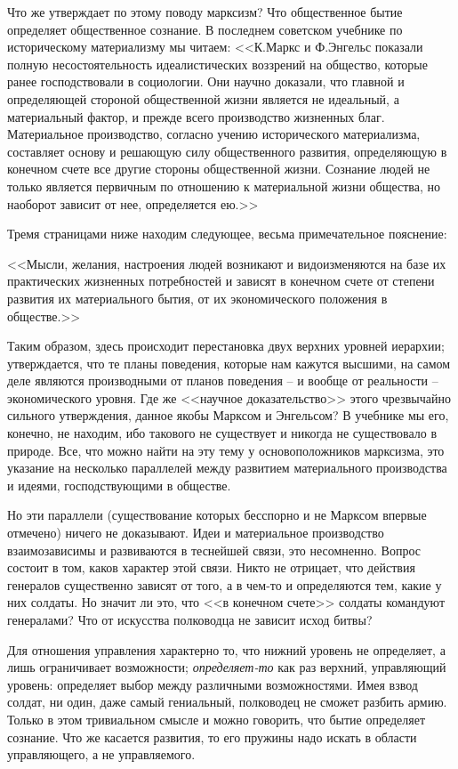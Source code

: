 \documentclass{book}
\begin{document}
Что же утверждает по этому поводу марксизм? Что обще­ственное бытие определяет общественное сознание. В послед­нем советском 
учебнике по историческому материализму мы читаем: <<К.Маркс и Ф.Энгельс показали полную несостоятельность идеалистических 
воззрений на общество, которые ранее господ­ствовали в социологии. Они научно доказали, что главной и определяющей стороной 
общественной жизни является не иде­альный, а материальный фактор, и прежде всего производство жизненных благ. Материальное 
производство, согласно учению исторического материализма, составляет основу и решающую силу общественного развития, определяющую 
в конечном счете все другие стороны общественной жизни. Сознание людей не только является первичным по отношению к материальной 
жи­зни общества, но наоборот зависит от нее, определяется ею.>>

Тремя страницами ниже находим следующее, весьма приме­чательное пояснение:

<<Мысли, желания, настроения людей возникают и видоизме­няются на базе их практических жизненных потребностей и зависят в конечном 
счете от степени развития их материального бытия, от их экономического положения в обществе.>>

Таким образом, здесь происходит перестановка двух верхних уровней иерархии; утверждается, что те планы поведения, которые нам 
кажутся высшими, на самом деле являются производными от планов поведения -- и вообще от реальности -- экономи­ческого уровня. Где 
же <<научное доказательство>> этого чрезвычайно сильного утверждения, данное якобы Марксом и Энгельсом? В учебнике мы его, 
конечно, не находим, ибо такового не существует и никогда не существовало в природе. Все, что можно найти на эту тему у 
основоположников марксизма, это указание на несколько параллелей между развитием материального производства и идеями, 
господствующими в обществе.

Но эти параллели (существование которых бесспорно и не Марксом впервые отмечено) ничего не доказывают. Идеи и мате­риальное 
производство взаимозависимы и развиваются в тес­нейшей связи, это несомненно. Вопрос состоит в том, каков ха­рактер этой связи. 
Никто не отрицает, что действия генералов существенно зависят от того, а в чем-то и определяются тем, ка­кие у них солдаты. Но 
значит ли это, что <<в конечном счете>> сол­даты командуют генералами? Что от искусства полководца не зависит исход битвы?

Для отношения управления характерно то, что нижний уро­вень не определяет, а лишь ограничивает возможности; \textit{определяет-то}  как раз верхний, управляющий уровень: определяет выбор между различными возможностями. Имея взвод солдат, ни один, даже 
самый гениальный, полководец не сможет разбить армию. Только в этом тривиальном смысле и можно говорить, что бытие определяет 
сознание. Что же касается развития, то его пружины надо искать в области управляющего, а не управляемого.
\end{document}
